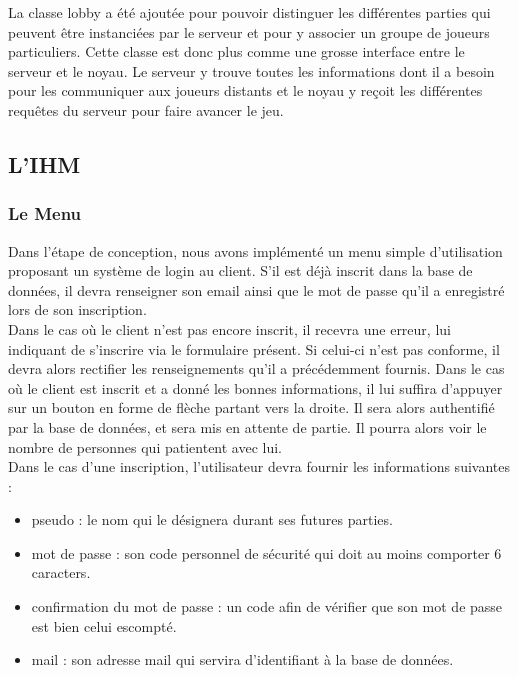 \documentclass[a4paper,11pt]{article}
\begin{document}
	La classe lobby a été ajoutée pour pouvoir distinguer les différentes parties qui peuvent être instanciées par le serveur et pour y associer un groupe de joueurs particuliers. Cette classe est donc plus comme une grosse interface entre le serveur et le noyau. Le serveur y trouve toutes les informations dont il a besoin pour les communiquer aux joueurs distants et le noyau y reçoit les différentes requêtes du serveur pour faire avancer le jeu.  \\
	


\subsection{L'IHM}


\subsubsection{Le Menu}

	Dans l'étape de conception, nous avons implémenté un menu simple d’utilisation proposant un système de login au client. S’il est déjà inscrit dans la base de données, il devra renseigner son email ainsi que le mot de passe qu’il a enregistré lors de son inscription. \\

    Dans le cas où le client n’est pas encore inscrit, il recevra une erreur, lui indiquant de s’inscrire via le formulaire présent. Si celui-ci n’est pas conforme, il devra alors rectifier les renseignements qu’il a précédemment fournis. Dans le cas où le client est inscrit et a donné les bonnes informations, il lui suffira d’appuyer sur un bouton en forme de flèche partant vers la droite. Il sera alors authentifié par la base de données, et sera mis en attente de partie. Il pourra alors voir le nombre de personnes qui patientent avec lui. \\

	Dans le cas d’une inscription, l’utilisateur devra fournir les informations suivantes :

\begin{itemize}
	\item pseudo : le nom qui le désignera durant ses futures parties.
	\item mot de passe : son code personnel de sécurité qui doit au moins comporter 6 caracters.
	\item confirmation du mot de passe : un code afin de vérifier que son mot de passe est bien celui escompté.
	\item mail : son adresse mail qui servira d’identifiant à la base de données. 	 \\
\end{itemize}
\end{document}
